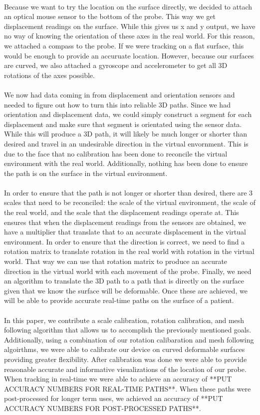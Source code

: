 \\
Because we want to try the location on the surface directly, we decided to attach an optical mouse sensor to the bottom of the probe. This way we get displacement readings on the surface. While this gives us x and y output, we have no way of knowing the orientation of these axes in the real world. For this reason, we attached a compass to the probe. If we were tracking on a flat surface, this would be enough to provide an accuruate location. However, because our surfaces are curved, we also attached a gyroscope and accelerometer to get all 3D rotations of the axes possible. \\
\\
We now had data coming in from displacement and orientation sensors and needed to figure out how to turn this into reliable 3D paths. Since we had orientation and displacement data, we could simply construct a segment for each displacement and make sure that segment is orientated using the sensor data. While this will produce a 3D path, it will likely be much longer or shorter than desired and travel in an undesirable direction in the virtual envornment. This is due to the face that no calibration has been done to reconcile the virtual environment with the real world. Additionally, nothing has been done to ensure the path is on the surface in the virtual environment.\\
\\
In order to ensure that the path is not longer or shorter than desired, there are 3 scales that need to be reconciled: the scale of the virtual environment, the scale of the real world, and the scale that the displacement readings operate at. This ensures that when the displacement readings from the sensors are obtained, we have a multiplier that translate that to an accurate displacement in the virtual environment. In order to ensure that the direction is correct, we need to find a rotation matrix to translate rotation in the real world with rotation in the virtual world. That way we can use that rotation matrix to produce an accurate direction in the virtual world with each movement of the probe. Finally, we need an algorithm to translate the 3D path to a path that is directly on the surface given that we know the surface will be deformable. Once these are achieved, we will be able to provide accurate real-time paths on the surface of a patient. \\
\\
In this paper, we contribute a scale calibration, rotation calibration, and mesh following algorithm that allows us to accomplish the previously mentioned goals. Additionally, using a combination of our rotation calibaration and mesh following algoirthms, we were able to calibrate our device on curved deformable surfaces providing greater flexibility. After calibration was done we were able to provide reasonable accurate and informative visualizations of the location of our probe. When tracking in real-time we were able to achieve an accuracy of **PUT ACCURACY NUMBERS FOR REAL-TIME PATHS**. When these paths were post-processed for longer term uses, we achieved an accuracy of **PUT ACCURACY NUMBERS FOR POST-PROCESSED PATHS**.  

